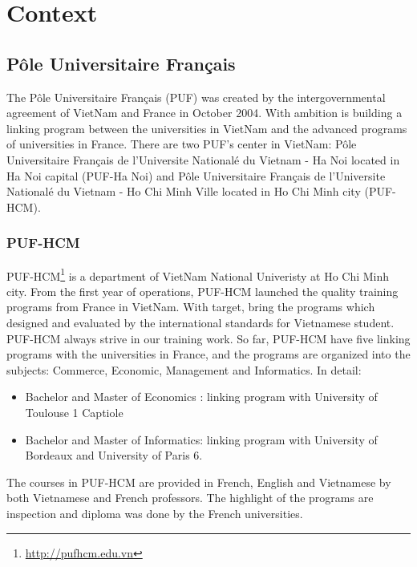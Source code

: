\documentclass[hidelinks,12pt,a4paper]{report}
\begin{document}
\chapter{Context}
\section{Pôle Universitaire Français}
The Pôle Universitaire Français (PUF) was created by the intergovernmental agreement of VietNam and France in October 2004. With ambition is building a linking program between the universities in VietNam and the advanced programs of universities in France. There are two PUF’s center in VietNam: Pôle Universitaire Français de l’Universite Nationalé du Vietnam - Ha Noi located in Ha Noi capital (PUF-Ha Noi) and Pôle Universitaire Français de l’Universite Nationalé du Vietnam - Ho Chi Minh Ville located in Ho Chi Minh city (PUF-HCM).
\subsection{PUF-HCM}
PUF-HCM\footnote{\url{http://pufhcm.edu.vn}} is a department of VietNam National Univeristy at Ho Chi Minh city. From the first year of operations, PUF-HCM launched the quality training programs from France in VietNam. With target, bring the programs which designed and evaluated by the international standards for Vietnamese student. PUF-HCM always strive in our training work. So far, PUF-HCM have five linking programs with the universities in France, and the programs are organized into the subjects: Commerce, Economic, Management and Informatics. In detail:

\begin{itemize}
	\item Bachelor and Master of Economics : linking program with University of Toulouse 1 Captiole
	\item Bachelor and Master of Informatics: linking program with University of Bordeaux and University of Paris 6.
\end{itemize}
The courses in PUF-HCM are provided in French, English and Vietnamese by both Vietnamese and French professors. The highlight of the programs are inspection and diploma was done by the French universities.
\end{document}
